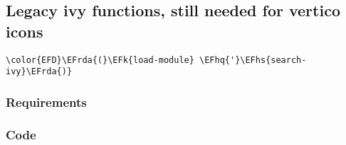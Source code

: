 \documentclass[a4wide,10pt]{article}
\newcommand{\EFk}[1]{\textcolor{EFk}{#1}} %
\newcommand{\EFhq}[1]{\textcolor{EFhq}{#1}} %
\newcommand{\EFhs}[1]{\textcolor{EFhs}{#1}} %
\newcommand{\EFrda}[1]{\textcolor{EFrda}{#1}} %
\begin{document}
\subsection{Legacy ivy functions, still needed for vertico icons}
\label{sec:org9fc8419}
\begin{Code}
\begin{Verbatim}
\color{EFD}\EFrda{(}\EFk{load-module} \EFhq{'}\EFhs{search-ivy}\EFrda{)}
\end{Verbatim}
\end{Code}
\subsubsection{Requirements}
\label{sec:org4fb344b}
\subsubsection{Code}
\label{sec:orgb0e4599}
\end{document}
